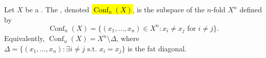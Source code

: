 \begin{definition} \label{definition:ordered_configuration_space_of_n_points_in_a_topological_space}
Let $X$ be a . 
The , denoted \hl{$\operatorname{Conf}_n(X)$}, is the subspace of the $n$-fold  $X^n$ defined by
$$\operatorname{Conf}_n(X) = \{ (x_1, \dots, x_n) \in X^n : x_i \neq x_j \text{ for } i \neq j \}.$$
Equivalently, $\operatorname{Conf}_n(X) = X^n \setminus \Delta$, where $\Delta = \{ (x_1, \dots, x_n) : \exists i \neq j \text{ s.t. } x_i = x_j \}$ is the fat diagonal.
\end{definition}